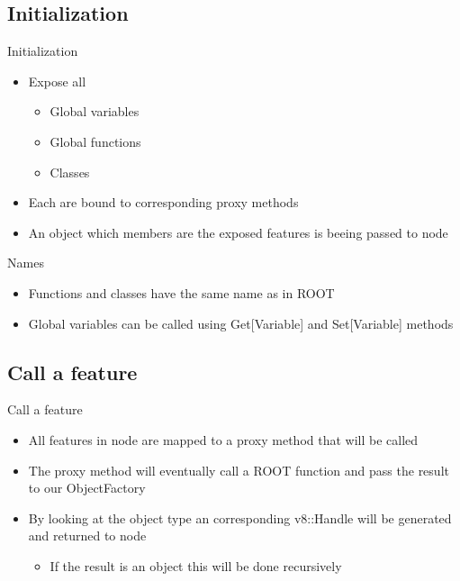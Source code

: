 \subsection{Initialization}
\begin{frame}{Initialization}
  \begin{itemize}
    \item Expose all
    \begin{itemize}
      \item Global variables
      \item Global functions
      \item Classes
    \end{itemize}
    \pause
    \item Each are bound to corresponding proxy methods
    \item An object which members are the exposed features is beeing passed to node
  \end{itemize}
  \pause
  \begin{block}{Names}
    \begin{itemize}
      \item Functions and classes have the same name as in ROOT
      \item Global variables can be called using Get[Variable] and Set[Variable] methods
    \end{itemize}
  \end{block}
\end{frame}


\subsection{Call a feature}
\begin{frame}{Call a feature}
  \begin{itemize}
    \item All features in node are mapped to a proxy method that will be called
    \pause
    \item The proxy method will eventually call a ROOT function and pass the result to our ObjectFactory
    \pause
    \item By looking at the object type an corresponding v8::Handle will be generated and returned to node
    \begin{itemize}
      \item If the result is an object this will be done recursively
    \end{itemize}
  \end{itemize}
\end{frame}

